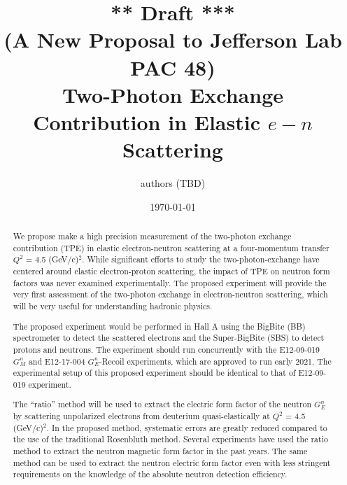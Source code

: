 \documentclass[11pt]{article}
\begin{document}
\title{{ \large*** Draft *** \\ (A New Proposal to Jefferson Lab PAC 48)} \\
\textbf{ \large Two-Photon Exchange Contribution in Elastic $e-n$ Scattering}}
\author{\small authors (TBD)}
\date{\small \today}
\maketitle 
\begin{abstract}
We propose make a high precision measurement of the two-photon exchange contribution (TPE) in elastic electron-neutron scattering at a four-momentum transfer $Q^2$ = 4.5 (GeV/c)$^2$. While significant efforts to study the two-photon-exchange have centered around elastic electron-proton scattering, the impact of TPE on neutron form factors was never examined experimentally. The proposed experiment will provide the very first assessment of the two-photon exchange in electron-neutron scattering, which will be very useful for understanding hadronic physics. \par
The proposed experiment would be performed in Hall A using the BigBite (BB) spectrometer to detect the scattered electrons and the Super-BigBite (SBS) to detect protons and neutrons. The experiment should run concurrently with the E12-09-019 $G_M^n$ and E12-17-004 $G_E^n$-Recoil experiments, which are approved to run early 2021. The experimental setup of this proposed experiment should be identical to that of E12-09-019 experiment. \par
The \enquote{ratio} method will be used to extract the electric form factor of the neutron $G_E^n$ by scattering unpolarized electrons from deuterium quasi-elastically at $Q^2$ = 4.5 (GeV/c)$^2$. In the proposed method, systematic errors are greatly reduced compared to the use of the traditional Rosenbluth method. Several experiments have used the ratio method to extract the neutron magnetic form factor in the past years. The same method can be used to extract the neutron electric form factor even with less stringent requirements on the knowledge of the absolute neutron detection efficiency. \par
\end{abstract}
\tableofcontents
\linenumbers
\end{document}
